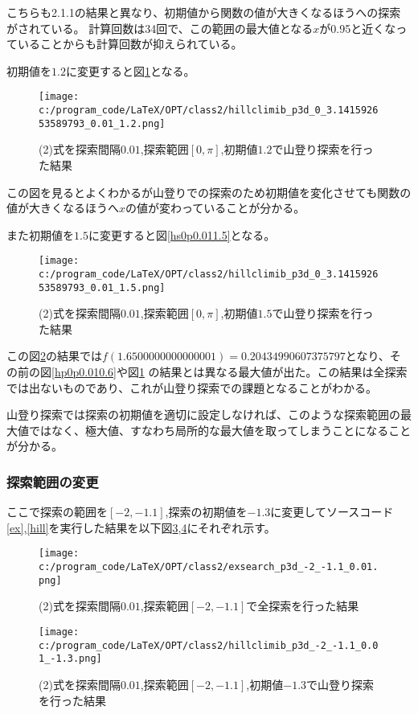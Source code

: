 \documentclass[a4paper,11pt,dvipdfmx]{jsarticle}
\begin{document}
こちらも2.1.1の結果と異なり、初期値から関数の値が大きくなるほうへの探索がされている。
計算回数は34回で、この範囲の最大値となる$x$が0.95と近くなっていることからも計算回数が抑えられている。

初期値を$1.2$に変更すると図\ref{hp0p0.011.2}となる。
\begin{figure}[h]
    \centering
    \texttt{[image: c:/program\_code/LaTeX/OPT/class2/hillclimib\_p3d\_0\_3.141592653589793\_0.01\_1.2.png]}
    \caption{(2)式を探索間隔$0.01$,探索範囲$[0,\pi]$,初期値$1.2$で山登り探索を行った結果}
    \label{hp0p0.011.2}
\end{figure}

この図を見るとよくわかるが山登りでの探索のため初期値を変化させても関数の値が大きくなるほうへ$x$の値が変わっていることが分かる。

また初期値を$1.5$に変更すると図\ref{hs0p0.011.5}となる。
\begin{figure}[h]
    \centering
    \texttt{[image: c:/program\_code/LaTeX/OPT/class2/hillclimib\_p3d\_0\_3.141592653589793\_0.01\_1.5.png]}
    \caption{(2)式を探索間隔$0.01$,探索範囲$[0,\pi]$,初期値$1.5$で山登り探索を行った結果}
    \label{hp0p0.011.5}
\end{figure}

この図\ref{hp0p0.011.5}の結果では$f(1.6500000000000001)=0.20434990607375797$となり、その前の図\ref{hp0p0.010.6}や図\ref{hp0p0.011.2}
の結果とは異なる最大値が出た。この結果は全探索では出ないものであり、これが山登り探索での課題となることがわかる。

山登り探索では探索の初期値を適切に設定しなければ、このような探索範囲の最大値ではなく、極大値、すなわち局所的な最大値を取ってしまうことになることが分かる。

\subsubsection{探索範囲の変更}
ここで探索の範囲を$[-2,-1.1]$,探索の初期値を$-1.3$に変更してソースコード\ref{ex},\ref{hill}を実行した結果を以下図\ref{he-2-1.10.01-1.3},\ref{hp-2-1.10.01-1.3}にそれぞれ示す。
\begin{figure}[h]
    \centering
    \texttt{[image: c:/program\_code/LaTeX/OPT/class2/exsearch\_p3d\_-2\_-1.1\_0.01.png]}
    \caption{(2)式を探索間隔$0.01$,探索範囲$[-2,-1.1]$で全探索を行った結果}
    \label{he-2-1.10.01-1.3}
\end{figure}
\begin{figure}[h]
    \centering
    \texttt{[image: c:/program\_code/LaTeX/OPT/class2/hillclimib\_p3d\_-2\_-1.1\_0.01\_-1.3.png]}
    \caption{(2)式を探索間隔$0.01$,探索範囲$[-2,-1.1]$,初期値$-1.3$で山登り探索を行った結果}
    \label{hp-2-1.10.01-1.3}
\end{figure}
\end{document}
